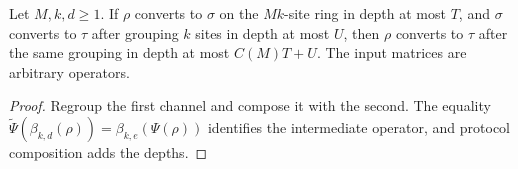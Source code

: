 \begin{corollary}
    \label{cor:qc_unblocked_then_blocked_conversion}
    \leanok
    Let $M,k,d\ge1$. If $\rho$ converts to $\sigma$ on the $Mk$-site ring in
    depth at most $T$, and $\sigma$ converts to $\tau$ after grouping $k$ sites
    in depth at most $U$, then $\rho$ converts to $\tau$ after the same grouping
    in depth at most $C(M)T+U$. The input matrices are arbitrary operators.
\end{corollary}
\begin{proof}
    \leanok
    Regroup the first channel and compose it with the second.
    The equality $\widetilde\Psi(\beta_{k,d}(\rho))=\beta_{k,e}(\Psi(\rho))$
    identifies the intermediate operator, and protocol composition adds the depths.
\end{proof}


